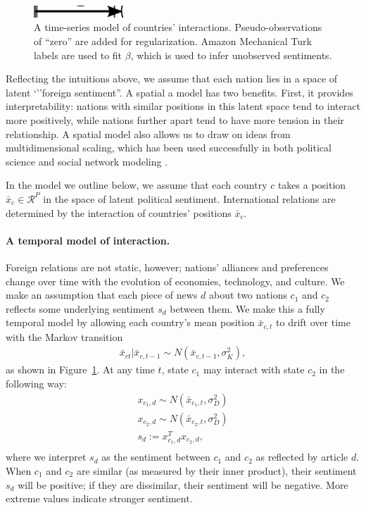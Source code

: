 \begin{figure}
  \center
  \vspace{-55pt}
  \includegraphics[width=0.3\textwidth]{chapter_foreign_relations/figures/countries_gm.pdf}
  \caption{A time-series model of countries' interactions.
    Pseudo-observations of ``zero'' are added for regularization.
    Amazon Mechanical Turk labels are used to fit $\beta$, which is
    used to infer unobserved sentiments.}
  \label{figure:gm}
  \vspace{-30pt}
\end{figure}
Reflecting the intuitions above, we assume that each nation lies in a
space of latent `''foreign sentiment''.  A spatial a model has two
benefits. First, it provides interpretability: nations with similar
positions in this latent space tend to interact more positively, while
nations further apart tend to have more tension in their relationship.
A spatial model also allows us to draw on ideas from
multidimensional scaling, which has been used successfully in both
political science \cite{martin:2002,jackman:2001} and social network
modeling \cite{hoff:2002,chang:2009}.

In the model we outline below, we assume that each country $c$ takes a
position $\bar x_c \in \mathcal{R}^P$ in the space of latent political
sentiment. International relations are determined by the interaction
of countries' positions $\bar x_c$.

\paragraph{A temporal model of interaction.}
Foreign relations are not static, however; nations' alliances and
preferences change over time with the evolution of economies,
technology, and culture.  We make an assumption that each piece of
news $d$ about two nations $c_1$ and $c_2$ reflects some underlying
sentiment $s_d$ between them.  We make this a fully temporal model by
allowing each country's mean position $\bar x_{c,t}$ to drift over
time with the Markov transition
\begin{align}
  \bar x_{ct} | \bar x_{c,t-1} \sim N(\bar x_{c,t-1}, \sigma_K^2),
\end{align}
as shown in Figure~\ref{figure:gm}. At any time $t$, state $c_1$ may interact with state $c_2$ in the following way:
\begin{align}
  x_{c_1,d} \sim N(\bar x_{c_1, t}, \sigma_D^2) \nonumber \\
  x_{c_2,d} \sim N(\bar x_{c_2, t}, \sigma_D^2) \nonumber \\
  s_d := x_{c_1,d}^T x_{c_2,d}, \nonumber \\
\label{equation:sentiment}
\end{align}
where we interpret $s_d$ as the sentiment between $c_1$ and $c_2$ as
reflected by article $d$.  When $c_1$ and $c_2$ are similar (as
measured by their inner product), their sentiment $s_d$ will be
positive; if they are dissimilar, their sentiment will be negative.
More extreme values indicate stronger sentiment.



